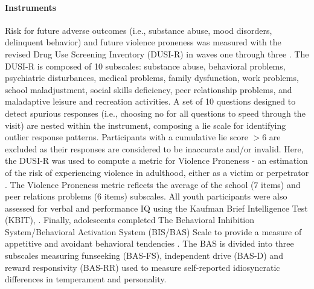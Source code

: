 \documentclass[utf8]{frontiersSCNS} %
\begin{document}
\paragraph{Instruments} Risk for future adverse outcomes (i.e., substance abuse, mood disorders, delinquent behavior) and future violence proneness was measured with the revised Drug Use Screening Inventory (DUSI-R) in waves one through three \citep{tarter1994reliability}. The DUSI-R is composed of 10 subscales: substance abuse, behavioral problems, psychiatric disturbances, medical problems, family dysfunction, work problems, school maladjustment, social skills deficiency, peer relationship problems, and maladaptive leisure and recreation activities. A set of 10 questions designed to detect spurious responses (i.e., choosing no for all questions to speed through the visit) are nested within the instrument, composing a lie scale for identifying outlier response patterns. Participants with a cumulative lie score $>6$ are excluded as their responses are considered to be inaccurate and/or invalid. Here, the DUSI-R was used to compute a metric for Violence Proneness - an estimation of the risk of experiencing violence in adulthood, either as a victim or perpetrator \citep{kirisci2009violence}. The Violence Proneness metric reflects the average of the school ($7$ items) and peer relations problems ($6$ items) subscales. All youth participants were also assessed for verbal and performance IQ using the Kaufman Brief Intelligence Test (KBIT), \citep{kaufman2004kaufman}. Finally, adolescents completed The Behavioral Inhibition System/Behavioral Activation System (BIS/BAS) Scale  to provide a measure of appetitive and avoidant behavioral tendencies \citep{carver1994behavioral}. The BAS is divided into three subscales measuring funseeking (BAS-FS), independent drive (BAS-D) and reward responsivity (BAS-RR) used to measure self-reported idiosyncratic differences in temperament and personality.
\end{document}
